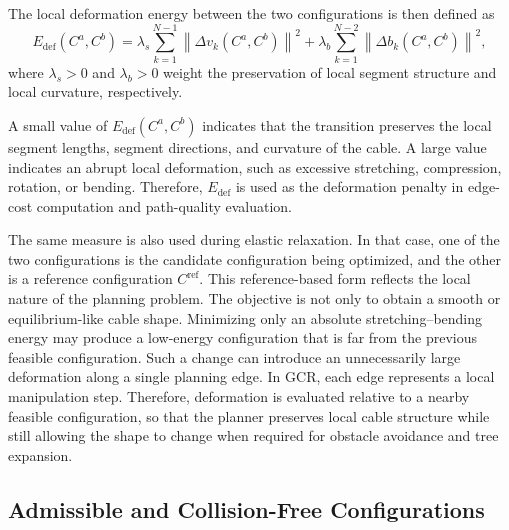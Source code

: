 \documentclass{pas}
\begin{document}
The local deformation energy between the two configurations is then defined as
\begin{equation}
E_{\mathrm{def}}(C^a,C^b)
=
\lambda_s
\sum_{k=1}^{N-1}
\left\|
\Delta v_k(C^a,C^b)
\right\|^2
+
\lambda_b
\sum_{k=1}^{N-2}
\left\|
\Delta b_k(C^a,C^b)
\right\|^2,
\label{eq:gcr_transition_deformation_energy}
\end{equation}
where \(\lambda_s>0\) and \(\lambda_b>0\) weight the preservation of local
segment structure and local curvature, respectively.

A small value of \(E_{\mathrm{def}}(C^a,C^b)\) indicates that the transition
preserves the local segment lengths, segment directions, and curvature of the
cable. A large value indicates an abrupt local deformation, such as excessive
stretching, compression, rotation, or bending. Therefore, \(E_{\mathrm{def}}\)
is used as the deformation penalty in edge-cost computation and path-quality
evaluation.

The same measure is also used during elastic relaxation. In that case, one of
the two configurations is the candidate configuration being optimized, and the
other is a reference configuration \(C^{\mathrm{ref}}\).
This reference-based form reflects the local nature of the planning problem.
The objective is not only to obtain a smooth or equilibrium-like cable shape.
Minimizing only an absolute stretching--bending energy may produce a low-energy
configuration that is far from the previous feasible configuration. Such a
change can introduce an unnecessarily large deformation along a single planning
edge. In GCR, each edge represents a local manipulation step. Therefore,
deformation is evaluated relative to a nearby feasible configuration, so that the
planner preserves local cable structure while still allowing the shape to change
when required for obstacle avoidance and tree expansion.



\subsection{Admissible and Collision-Free Configurations}
\label{subsec:configuration_space}
\end{document}
